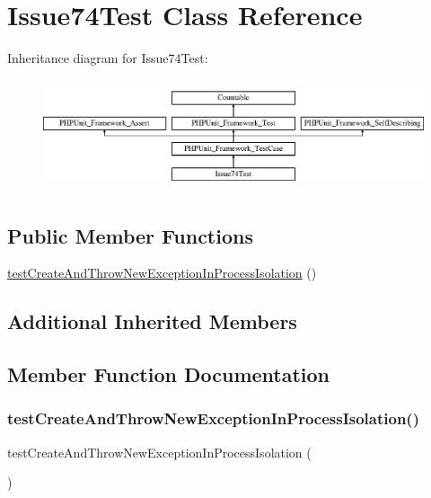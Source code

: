 \hypertarget{class_issue74_test}{}\section{Issue74\+Test Class Reference}
\label{class_issue74_test}
Inheritance diagram for Issue74\+Test\+:\begin{figure}[H]
\begin{center}
\leavevmode
\includegraphics[height=3.303835cm]{class_issue74_test}
\end{center}
\end{figure}
\subsection*{Public Member Functions}
\begin{DoxyCompactItemize}
\item 
\mbox{\hyperlink{class_issue74_test_ab714844769c2ccb100616117e9e44c5d}{test\+Create\+And\+Throw\+New\+Exception\+In\+Process\+Isolation}} ()
\end{DoxyCompactItemize}
\subsection*{Additional Inherited Members}


\subsection{Member Function Documentation}
\mbox{\label{class_issue74_test_ab714844769c2ccb100616117e9e44c5d}} 
\subsubsection{\texorpdfstring{test\+Create\+And\+Throw\+New\+Exception\+In\+Process\+Isolation()}{testCreateAndThrowNewExceptionInProcessIsolation()}}
{\footnotesize\ttfamily test\+Create\+And\+Throw\+New\+Exception\+In\+Process\+Isolation (\begin{DoxyParamCaption}{ }\end{DoxyParamCaption})}




